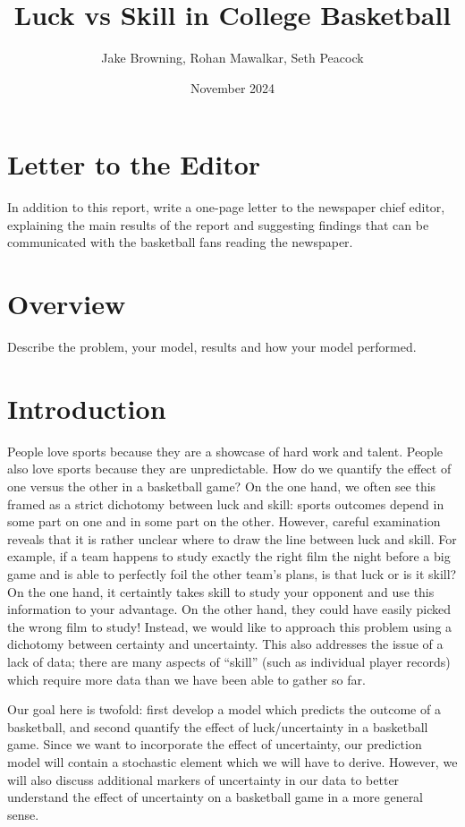 \documentclass{article}
\title{Luck vs Skill in College Basketball}
\author{Jake Browning, Rohan Mawalkar, Seth Peacock}
\date{November 2024}
\begin{document}
\maketitle

\section{Letter to the Editor}
In addition to this report, write a one-page letter to the newspaper chief editor, explaining the main results of
the report and suggesting findings that can be communicated with the basketball fans reading the newspaper.

\section{Overview}
Describe the problem, your model, results and how your model performed.

\section{Introduction}

People love sports because they are a showcase of hard work and talent. People also love sports because they are unpredictable. How do we quantify the effect of one versus the other in a basketball game? On the one hand, we often see this framed as a strict dichotomy between luck and skill: sports outcomes depend in some part on one and in some part on the other. However, careful examination reveals that it is rather unclear where to draw the line between luck and skill. For example, if a team happens to study exactly the right film the night before a big game and is able to perfectly foil the other team's plans, is that luck or is it skill? On the one hand, it certaintly takes skill to study your opponent and use this information to your advantage. On the other hand, they could have easily picked the wrong film to study! Instead, we would like to approach this problem using a dichotomy between certainty and uncertainty.  This also addresses the issue of a lack of data; there are many aspects of ``skill'' (such as individual player records) which require more data than we have been able to gather so far.

Our goal here is twofold: first develop a model which predicts the outcome of a basketball, and second quantify the effect of luck/uncertainty in a basketball game. Since we want to incorporate the effect of uncertainty, our prediction model will contain a stochastic element which we will have to derive. However, we will also discuss additional markers of uncertainty in our data to better understand the effect of uncertainty on a basketball game in a more general sense. 
\end{document}
